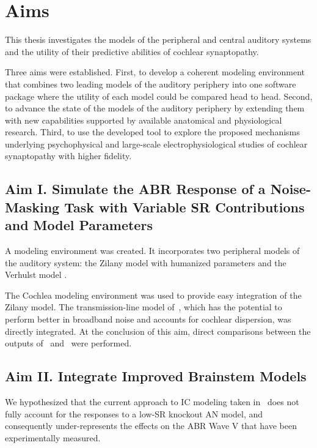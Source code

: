 \chapter{Aims}
\label{chapter:Aims}
\thispagestyle{myheadings}
This thesis investigates the models of the peripheral and central auditory systems and the utility of their predictive abilities of cochlear synaptopathy. 

Three aims were established.  First, to develop a coherent modeling environment that combines two leading models of the auditory periphery into one software package where the utility of each model could be compared head to head.  Second, to advance the state of the models of the auditory periphery by extending them with new capabilities supported by available anatomical and physiological research.  Third, to use the developed tool to explore the proposed mechanisms underlying psychophysical and large-scale electrophysiological studies of cochlear synaptopathy with higher fidelity.


\section{Aim I. Simulate the ABR Response of a Noise-Masking Task with Variable SR Contributions and Model Parameters}
A modeling environment was created.  It incorporates two peripheral models of the auditory system: the Zilany model with humanized parameters \citep{Zilany2014Updated} and the Verhulst model \citep{Verhulst2015Functional}.  

The Cochlea modeling environment \citep{Rudnicki2014Cochlea} was used to provide easy integration of the Zilany model. The transmission-line model of~\cite{Verhulst2015Functional}, which has the potential to perform better in broadband noise and accounts for cochlear dispersion, was directly integrated.
At the conclusion of this aim, direct comparisons between the outputs of~\cite{Zilany2014Updated} and~\cite{Verhulst2015Functional} were performed.

\section{Aim II. Integrate Improved Brainstem Models}  

We hypothesized that the current approach to IC modeling taken in~\cite{Verhulst2015Functional,Mehraei2016Auditory} does not fully account for the responses to a low-SR knockout AN model, and consequently under-represents the effects on the ABR Wave V that have been experimentally measured.  

